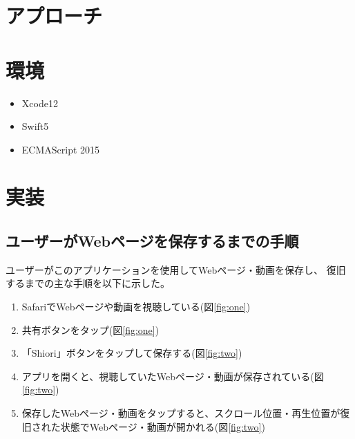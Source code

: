 \documentclass[a4j,10pt]{jsarticle}
\begin{document}
\begin{center}
\end{center}

\section{アプローチ}


\section{環境}
\begin{itemize}
\item Xcode12
\item Swift5
\item ECMAScript 2015
\end{itemize}

\section{実装}
\subsection{ユーザーがWebページを保存するまでの手順}
ユーザーがこのアプリケーションを使用してWebページ・動画を保存し、
復旧するまでの主な手順を以下に示した。
\begin{enumerate}
\item SafariでWebページや動画を視聴している(図\ref{fig:one})
\item 共有ボタンをタップ(図\ref{fig:one})
\item 「Shiori」ボタンをタップして保存する(図\ref{fig:two})
\item アプリを開くと、視聴していたWebページ・動画が保存されている(図\ref{fig:two})
\item 保存したWebページ・動画をタップすると、スクロール位置・再生位置が復旧された状態でWebページ・動画が開かれる(図\ref{fig:two})
\end{enumerate}
\end{document}

